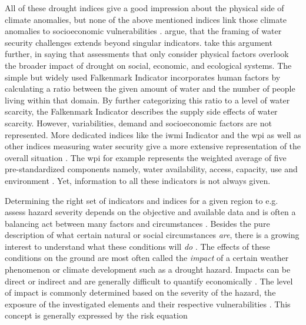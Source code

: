 All of these drought indices give a good impression about the physical side of climate anomalies, but none of the above mentioned indices link those climate anomalies to socioeconomic vulnerabilities \autocite{enenkelWhyPredictClimate2020}. \autocite{mishraWaterSecurityChanging2021} argue, that the framing of water security challenges extends beyond singular indicators. \autocite{lackstromBackyardHydroclimatologyCitizen2022} take this argument further, in saying that assessments that only consider physical factors overlook the broader impact of drought on social, economic, and ecological systems.\newline
The simple but widely used Falkenmark Indicator \autocite{falkenmarkMacroscaleWaterScarcity1989} incorporates human factors by calculating a ratio between the given amount of water and the number of people living within that domain. By further categorizing this ratio to a level of water scarcity, the Falkenmark Indicator describes the supply side effects of water scarcity. However, variabilities, demand and socioeconomic factors are not represented. More dedicated indices like the \acrfull{iwmi} Indicator and the \acrfull{wpi} as well as other indices measuring water security give a more extensive representation of the overall situation \autocite{arreguin-cortesMunicipalLevelWater2019,liuWaterScarcityAssessments2017}. The \acrshort{wpi} for example represents the weighted average of five pre-standardized components namely, water availability, access, capacity, use and environment \autocite{sullivanWaterPovertyIndex2003}. Yet, information to all these indicators is not always given.

Determining the right set of indicators and indices for a given region to e.g. assess hazard severity depends on the objective and available data and is often a balancing act between many factors and circumstances \autocite{svobodaHandbookDroughtIndicators2016}. Besides the pure description of what certain natural or social circumstances \textit{are}, there is a growing interest to understand what these conditions will \textit{do} \autocite{boultDroughtImpactbasedForecasting2022, lackstromBackyardHydroclimatologyCitizen2022}.\newline
The effects of these conditions on the ground are most often called the \textit{impact} of a certain weather phenomenon or climate development such as a drought hazard. Impacts can be direct or indirect and are generally difficult to quantify economically \autocite{vereintenationenSpecialReportDrought2021}. The level of impact is commonly determined based on the severity of the hazard, the exposure of the investigated elements and their respective vulnerabilities \autocite{harrowsmithFutureForecastImpact2020,svobodaHandbookDroughtIndicators2016,vereintenationenSpecialReportDrought2021}.
This concept is generally expressed by the risk equation

